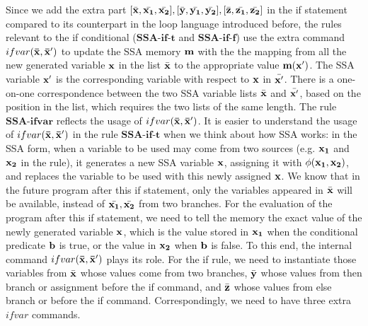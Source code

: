 Since we add the extra part $[\bar{{\bf{{x}}}}, \bar{{\bf{{x_1}}}}, \bar{{\bf{{x_2}}}}] ,[\bar{{\bf{{y}}}}, \bar{{\bf{{y_1}}}}, \bar{{\bf{{y_2}}}}] ,[\bar{{\bf{{z}}}},\bar{{\bf{{z_1}}}}, \bar{{\bf{{z_2}}}}]  $ in the if statement compared to its counterpart in the {loop} language introduced before, the rules relevant to the if conditional ($\textbf{SSA-if-t}$ and $\textbf{SSA-if-f}$) use the extra command $ifvar({\bf{{\bar{x}, \bar{x}'}}})$ to update the SSA memory ${\bf{{m}}}$ with the the mapping from all the new generated variable ${\bf{{x}}}$ in the list $\bar{{\bf{{x}}}}$ to the appropriate value ${\bf{{m(x')}}}$. The SSA variable ${\bf{{x'}}}$ is the corresponding variable with respect to ${\bf{{x}}}$ in $\bar{{\bf{{x'}}}}$. There is a one-on-one correspondence between the two SSA variable lists $\bar{{\bf{{x}}}}$ and ${\bar{{\bf{{x'}}}}}$, based on the position in the list, which requires the two lists of the same length.  
The rule $\textbf{SSA-ifvar}$ reflects the usage of $ifvar({\bf{{\bar{x}, \bar{x}'}}})$. It is easier to understand the usage of $ifvar({\bf{{\bar{x}, \bar{x}'}}})$ in the rule $\textbf{SSA-if-t}$ when we think about how SSA works: in the SSA form, when a variable to be used may come from two sources (e.g. ${\bf{{x_1}}}$ and ${\bf{{x_2}}}$ in the rule), it generates a new SSA variable ${\bf{{x}}}$, assigning it with $\phi({\bf{{x_1}}}, {\bf{{x_2}}})$,  and replaces the variable to be used with this newly assigned ${\bf{{x}}}$. We know that in the future program after this if statement, only the variables appeared in $\bar{{\bf{{x}}}}$ will be available, instead of   $\bar{{\bf{{x_1}}}}, \bar{{\bf{{x_2}}}}$ from two branches.  For the evaluation of the program after this if statement, we need to tell the memory the exact value of the newly generated variable ${\bf{{x}}}$, which is the value stored in ${\bf{{x_1}}}$ when the conditional predicate ${\bf{{b}}}$ is true, or the value in ${\bf{{x_2}}}$ when ${\bf{{b}}}$ is false. To this end, the internal command $ifvar({\bf{{\bar{x}, \bar{x}'}}})$ plays its role. For the if rule, we need to instantiate those variables from $\bar{{\bf{{x}}}}$ whose values come from two branches, $\bar{{\bf{{y}}}}$ whose values from then branch or assignment before the if command, and $\bar{{\bf{{z}}}}$ whose values from else branch or before the if command. Correspondingly, we need to have three extra $ifvar$ commands.   

